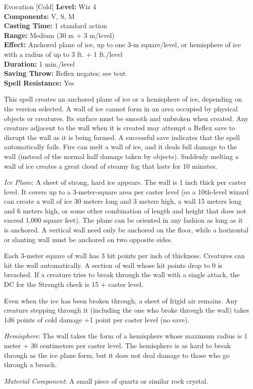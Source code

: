 {Evocation [Cold]}
{
	\textbf{Level:}
	Wiz 4\\
	\textbf{Components:}
	V, S, M\\
	\textbf{Casting Time:}
	1 standard action\\
	\textbf{Range:}
	Medium (30 m + 3 m/level)\\
	\textbf{Effect:}
	Anchored plane of ice, up to one 3-m square/level, or hemisphere of ice with a radius of up to 3 ft. + 1 ft./level\\
	\textbf{Duration:}
	1 min./level\\
	\textbf{Saving Throw:}
	Reflex negates; see text\\
	\textbf{Spell Resistance:}
	Yes\\
}
{
	This spell creates an anchored plane of ice or a hemisphere of ice, depending on the version selected. A wall of ice cannot form in an area occupied by physical objects or creatures. Its surface must be smooth and unbroken when created. Any creature adjacent to the wall when it is created may attempt a Reflex save to disrupt the wall as it is being formed. A successful save indicates that the spell automatically fails. Fire can melt a wall of ice, and it deals full damage to the wall (instead of the normal half damage taken by objects). Suddenly melting a wall of ice creates a great cloud of steamy fog that lasts for 10 minutes.

	\textit{Ice Plane}:
	A sheet of strong, hard ice appears. The wall is 1 inch thick per caster level. It covers up to a 3-meter-square area per caster level (so a 10th-level wizard can create a wall of ice 30 meters long and 3 meters high, a wall 15 meters long and 6 meters high, or some other combination of length and height that does not exceed 1,000 square feet). The plane can be oriented in any fashion as long as it is anchored. A vertical wall need only be anchored on the floor, while a horizontal or slanting wall must be anchored on two opposite sides.

	Each 3-meter square of wall has 3 hit points per inch of thickness. Creatures can hit the wall automatically. A section of wall whose hit points drop to 0 is breached. If a creature tries to break through the wall with a single attack, the DC for the Strength check is 15 + caster level.

	Even when the ice has been broken through, a sheet of frigid air remains. Any creature stepping through it (including the one who broke through the wall) takes 1d6 points of cold damage +1 point per caster level (no save).

	\textit{Hemisphere}:
	The wall takes the form of a hemisphere whose maximum radius is 1 meter + 30 centimeters per caster level. The hemisphere is as hard to break through as the ice plane form, but it does not deal damage to those who go through a breach.

	\textit{Material Component}:
	A small piece of quartz or similar rock crystal.

}
